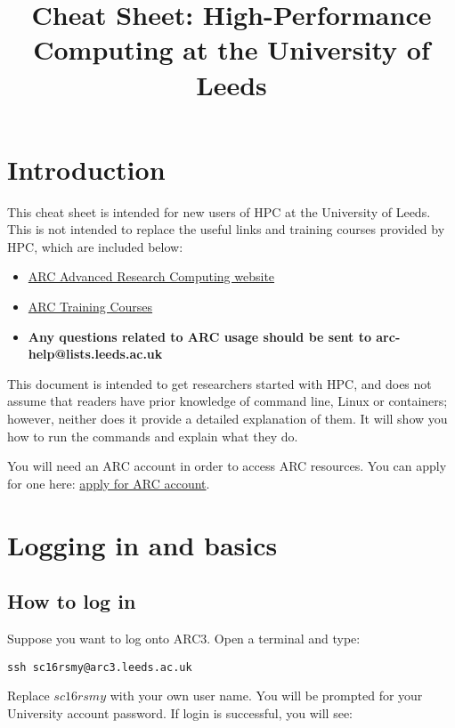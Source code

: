 \documentclass[]{article}
\title{Cheat Sheet: High-Performance Computing at the University of Leeds}
\begin{document}
\maketitle

\tableofcontents

\section{Introduction}

This cheat sheet is intended for new users of HPC at the University of Leeds. This is not intended to replace the useful links and training courses provided by HPC, which are included below:

\begin{itemize}
	\item \href{http://arc.leeds.ac.uk/}{ARC Advanced Research Computing website}
	\item \href{http://arc.leeds.ac.uk/training/}{ARC Training Courses} 
	\item \textbf{Any questions related to ARC usage should be sent to  arc-help@lists.leeds.ac.uk}
\end{itemize}

This document is intended to get researchers started with HPC, and does not assume that readers have prior knowledge of command line, Linux or containers; however, neither does it provide a detailed explanation of them. It will show you how to run the commands and explain what they do.

You will need an ARC account in order to access ARC resources. You can apply for one here: \href{http://arc.leeds.ac.uk/apply/}{apply for ARC account}.

\section{Logging in and basics}

\subsection{How to log in}

Suppose you want to log onto ARC3. Open a terminal and type:

\begin{lstlisting}
ssh sc16rsmy@arc3.leeds.ac.uk
\end{lstlisting}

Replace \(sc16rsmy\) with your own user name. You will be prompted for your University account password. If login is successful, you will see:
\end{document}
